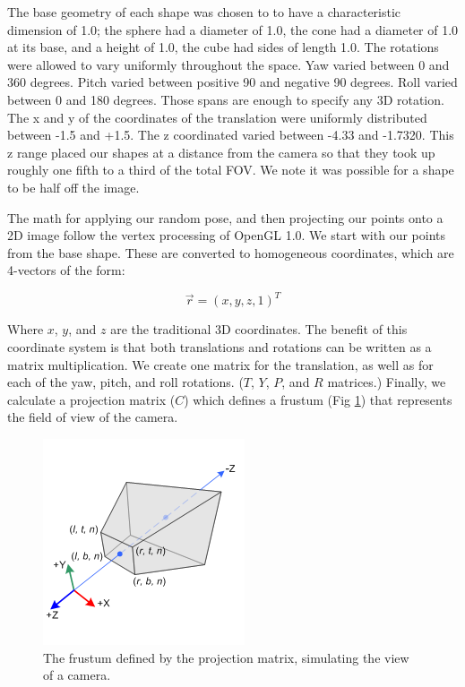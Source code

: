 \documentclass[journal]{IEEEtran}
\begin{document}
The base geometry of each shape was chosen to to have a characteristic dimension of 1.0; the sphere had a diameter of 1.0, the cone had a diameter of 1.0 at its base, and a height of 1.0, the cube had sides of length 1.0. The rotations were allowed to vary uniformly throughout the space. Yaw varied between 0 and 360 degrees. Pitch varied between positive 90 and negative 90 degrees. Roll varied between 0 and 180 degrees. Those spans are enough to specify any 3D rotation. The x and y of the coordinates of the translation were uniformly distributed between -1.5 and +1.5. The z coordinated varied between -4.33 and -1.7320. This z range placed our shapes at a distance from the camera so that they took up roughly one fifth to a third of the total FOV. We note it was possible for a shape to be half off the image.

The math for applying our random pose, and then projecting our points onto a 2D image follow the vertex processing of OpenGL 1.0. We start with our points from the base shape. These are converted to homogeneous coordinates, which are 4-vectors of the form:

\begin{equation}
\vec r = (x, y, z, 1)^T
\end{equation}

\noindent Where $x$, $y$, and $z$ are the traditional 3D coordinates.
The benefit of this coordinate system is that both translations and rotations can be written as a matrix multiplication. We create one matrix for the translation, as well as for each of the yaw, pitch, and roll rotations. ($T$, $Y$, $P$, and $R$ matrices.) Finally, we calculate a projection matrix ($C$) which defines a frustum (Fig \ref{openglFrustum}) that represents the field of view of the camera.

\begin{figure}
	\hspace{-10 ex}

	\centering
	\includegraphics[width=.8\linewidth]{gl_projectionmatrix01}

	\caption{The frustum defined by the projection matrix, simulating the view of a camera. \cite{opengl_image}}
	\label{openglFrustum}
\end{figure}
\end{document}
